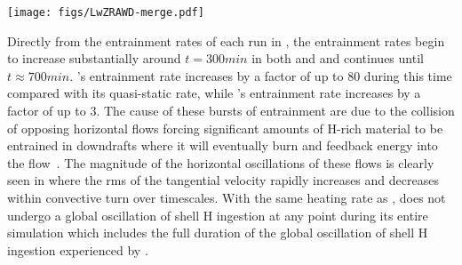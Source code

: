 \documentclass[fleqn,usenatbib]{mnras}
\newcommand{\airfluid}{convective fluid}
\begin{document}
\begin{figure*}

  \centering
  \texttt{[image: figs/LwZRAWD-merge.pdf]}
  \caption{Both panels show a rendering of the fractional volume FV of
          the material in the stable layer at $t = \unit{501}{min}$. The C-rich \airfluid{} is
          transparent. The left panel is from , while the right panel is from
          . The entrainment rate of H rapidly increases when a global oscillation of shell H ingestion instability
          occurs in . The hydrodynamic feedback from the energy released from
          burning causes even more H to be entrained and leads to an unstable runaway in
           but not in . This is contrasted with the quasi-static
          entrainment and burning in  ().}
  \label{fig:renderings}

\end{figure*}

Directly from the entrainment rates of each run in , the
entrainment rates begin to increase substantially around $t = \unit{300}{min}$
in both  and  and continues until $t \approx
\unit{700}{min}$. 's entrainment rate increases by a factor of up to
80 during this time compared with its quasi-static rate, while 's
entrainment rate increases by a factor of up to 3. The cause of these bursts of
entrainment are due to the collision of opposing horizontal flows forcing
significant amounts of H-rich material to be entrained in downdrafts where it
will eventually burn and feedback energy into the flow~\citep{Herwig:2014cx}.
The magnitude of the horizontal oscillations of these flows is clearly seen in
 where the rms of the tangential velocity rapidly increases and
decreases within convective turn over timescales. With the same heating rate as
,  does not undergo a global oscillation of shell H ingestion at any point during its entire
simulation which includes the full duration of the global oscillation of shell H ingestion experienced by
.
\end{document}
